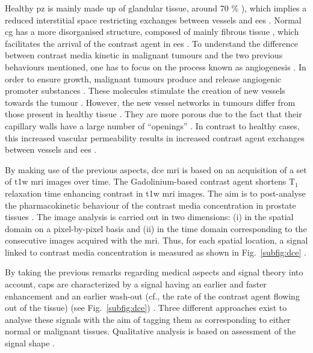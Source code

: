 Healthy \ac{pz} is mainly made up of glandular tissue, around 70 \% \cite{Choi2007}), which implies a reduced interstitial space restricting exchanges between vessels and \ac{ees} \cite{Buckley2004,Niekerk2009}.
Normal \ac{cg} has a more disorganised structure, composed of mainly fibrous tissue \cite{Choi2007,Hoeks2011}, which facilitates the arrival of the contrast agent in \ac{ees} \cite{Niekerk2013}.
To understand the difference between contrast media kinetic in malignant tumours and the two previous behaviours mentioned, one has to focus on the process known as angiogenesis \cite{Carmeliet2000}.
In order to ensure growth, malignant tumours produce and release angiogenic promoter substances \cite{Carmeliet2000}.
These molecules stimulate the creation of new vessels towards the tumour \cite{Carmeliet2000}.
However, the new vessel networks in tumours differ from those present in healthy tissue \cite{Gribbestad2005}.
They are more porous due to the fact that their capillary walls have a large number of ``openings'' \cite{Gribbestad2005,Choi2007}.
In contrast to healthy cases, this increased vascular permeability results in increased contrast agent exchanges between vessels and \ac{ees} \cite{Verma2012}.

By making use of the previous aspects, \ac{dce} \ac{mri} is based on an acquisition of a set of \ac{t1w} \ac{mri} images over time.
The Gadolinium-based contrast agent shortens T$_1$ relaxation time enhancing contrast in \ac{t1w} \ac{mri} images.
The aim is to post-analyse the pharmacokinetic behaviour of the contrast media concentration in prostate tissues \cite{Verma2012}.
The image analysis is carried out in two dimensions: (i) in the spatial domain on a pixel-by-pixel basis and (ii) in the time domain corresponding to the consecutive images acquired with the \ac{mri}.
Thus, for each spatial location, a signal linked to contrast media concentration is measured as shown in Fig.~\ref{subfig:dce} \cite{Tofts2010}. 

By taking the previous remarks regarding medical aspects and signal theory into account, \acp{cap} are characterized by a signal having an earlier and faster enhancement and an earlier wash-out (cf., the rate of the contrast agent flowing out of the tissue) (see Fig.~\ref{subfig:dce}) \cite{Verma2012}.
Three different approaches exist to analyse these signals with the aim of tagging them as corresponding to either normal or malignant tissues.
Qualitative analysis is based on assessment of the signal shape \cite{Hoeks2011}.

